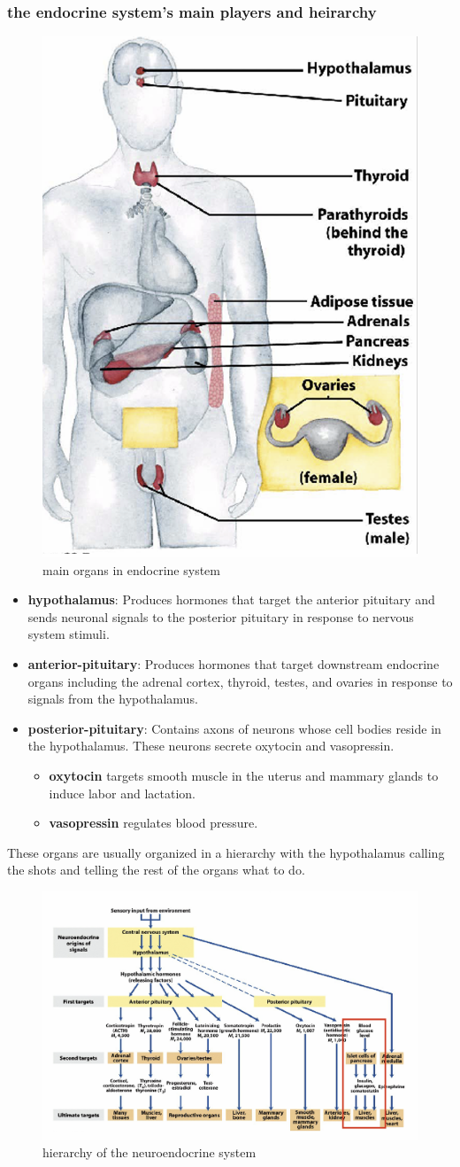 \documentclass[../main.tex]{subfiles}
\begin{document}
\subsubsection{the endocrine system's main players and heirarchy}
\begin{figure}[H]
    \centering
    \includegraphics[width=0.3\linewidth]{endocrineSystem.png}
    \caption{main organs in endocrine system}
    \label{fig:enter-label}
\end{figure}
\begin{itemize}
    \item \textbf{\gls{hypothalamus}}: Produces hormones that target the anterior pituitary and sends neuronal signals to the posterior pituitary in response to nervous system stimuli.
    
    \item \textbf{\gls{anterior-pituitary}}: Produces hormones that target downstream endocrine organs including the adrenal cortex, thyroid, testes, and ovaries in response to signals from the hypothalamus.
    
    \item \textbf{\gls{posterior-pituitary}}: Contains axons of neurons whose cell bodies reside in the hypothalamus. These neurons secrete \gls{oxytocin} and \gls{vasopressin}.
    
    \begin{itemize}
        \item \textbf{\gls{oxytocin}} targets smooth muscle in the uterus and mammary glands to induce labor and lactation.
        \item \textbf{\gls{vasopressin}} regulates blood pressure.
    \end{itemize}
\end{itemize}
These organs are usually organized in a hierarchy with the hypothalamus calling the shots and telling the rest of the organs what to do.
\begin{figure}[H]
    \centering
    \includegraphics[width=0.5\linewidth]{heirarchy.png}
    \caption{hierarchy of the neuroendocrine system}
    \label{fig:enter-label}
\end{figure}
\end{document}
